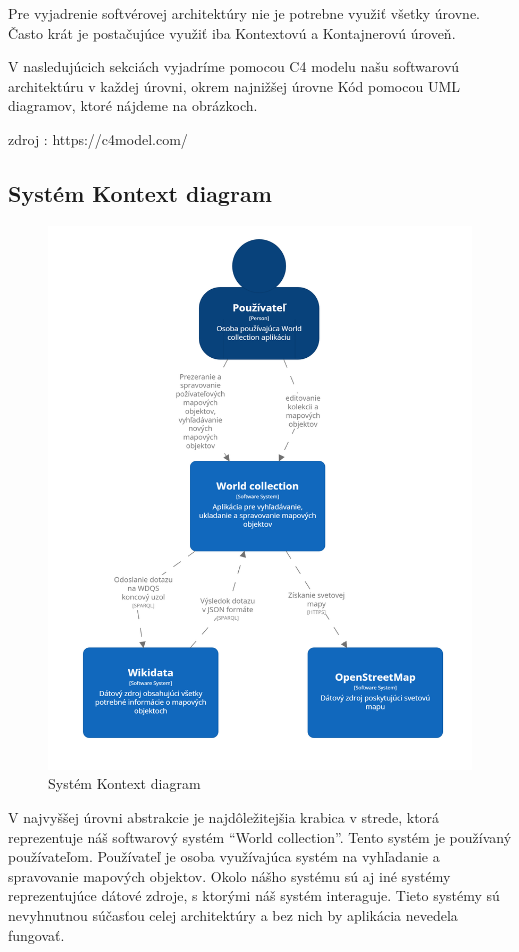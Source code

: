 Pre vyjadrenie softvérovej architektúry nie je potrebne využiť všetky úrovne.
Často krát je postačujúce využiť iba Kontextovú a Kontajnerovú úroveň.

V nasledujúcich sekciách vyjadríme pomocou C4 modelu našu softwarovú architektúru v každej úrovni, okrem najnižšej úrovne Kód pomocou UML diagramov, ktoré nájdeme na obrázkoch.

zdroj : https://c4model.com/

\subsection{Systém Kontext diagram}

\begin{figure}[h]
      \includegraphics[width=140mm]{../img/structurizr-SystemContext}
      \caption{Systém Kontext diagram}
\end{figure}

V najvyššej úrovni abstrakcie je najdôležitejšia krabica v strede, ktorá reprezentuje náš softwarový systém “World collection”. Tento systém je používaný používateľom.
Používateľ je osoba využívajúca systém na vyhľadanie a spravovanie mapových objektov.
Okolo nášho systému sú aj iné systémy reprezentujúce dátové zdroje, s ktorými náš systém interaguje. Tieto systémy sú nevyhnutnou
súčasťou celej architektúry a bez nich by aplikácia nevedela fungovať.

